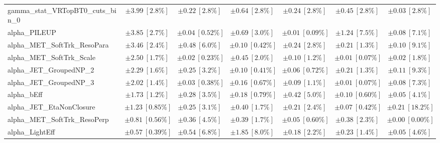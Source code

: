 \begin{sidewaystable}
\begin{center}
\begin{tabular*}{\textwidth}{@{\extracolsep{\fill}}lcccccc}
gamma\_stat\_VRTopBT0\_cuts\_bin\_0         & $\pm 3.99\ [2.8\%] $          & $\pm 0.22\ [2.8\%] $          & $\pm 0.64\ [2.8\%] $          & $\pm 0.24\ [2.8\%] $          & $\pm 0.45\ [2.8\%] $          & $\pm 0.03\ [2.8\%] $       \\
alpha\_PILEUP         & $\pm 3.85\ [2.7\%] $          & $\pm 0.04\ [0.52\%] $          & $\pm 0.69\ [3.0\%] $          & $\pm 0.01\ [0.09\%] $          & $\pm 1.24\ [7.5\%] $          & $\pm 0.08\ [7.1\%] $       \\
alpha\_MET\_SoftTrk\_ResoPara         & $\pm 3.46\ [2.4\%] $          & $\pm 0.48\ [6.0\%] $          & $\pm 0.10\ [0.42\%] $          & $\pm 0.24\ [2.8\%] $          & $\pm 0.21\ [1.3\%] $          & $\pm 0.10\ [9.1\%] $       \\
alpha\_MET\_SoftTrk\_Scale         & $\pm 2.50\ [1.7\%] $          & $\pm 0.02\ [0.23\%] $          & $\pm 0.45\ [2.0\%] $          & $\pm 0.10\ [1.2\%] $          & $\pm 0.01\ [0.07\%] $          & $\pm 0.02\ [1.8\%] $       \\
alpha\_JET\_GroupedNP\_2         & $\pm 2.29\ [1.6\%] $          & $\pm 0.25\ [3.2\%] $          & $\pm 0.10\ [0.41\%] $          & $\pm 0.06\ [0.72\%] $          & $\pm 0.21\ [1.3\%] $          & $\pm 0.11\ [9.3\%] $       \\
alpha\_JET\_GroupedNP\_3         & $\pm 2.02\ [1.4\%] $          & $\pm 0.03\ [0.38\%] $          & $\pm 0.16\ [0.67\%] $          & $\pm 0.09\ [1.1\%] $          & $\pm 0.01\ [0.07\%] $          & $\pm 0.08\ [7.3\%] $       \\
alpha\_bEff         & $\pm 1.73\ [1.2\%] $          & $\pm 0.28\ [3.5\%] $          & $\pm 0.18\ [0.79\%] $          & $\pm 0.42\ [5.0\%] $          & $\pm 0.10\ [0.60\%] $          & $\pm 0.05\ [4.1\%] $       \\
alpha\_JET\_EtaNonClosure         & $\pm 1.23\ [0.85\%] $          & $\pm 0.25\ [3.1\%] $          & $\pm 0.40\ [1.7\%] $          & $\pm 0.21\ [2.4\%] $          & $\pm 0.07\ [0.42\%] $          & $\pm 0.21\ [18.2\%] $       \\
alpha\_MET\_SoftTrk\_ResoPerp         & $\pm 0.81\ [0.56\%] $          & $\pm 0.36\ [4.5\%] $          & $\pm 0.39\ [1.7\%] $          & $\pm 0.05\ [0.60\%] $          & $\pm 0.38\ [2.3\%] $          & $\pm 0.00\ [0.00\%] $       \\
alpha\_LightEff         & $\pm 0.57\ [0.39\%] $          & $\pm 0.54\ [6.8\%] $          & $\pm 1.85\ [8.0\%] $          & $\pm 0.18\ [2.2\%] $          & $\pm 0.23\ [1.4\%] $          & $\pm 0.05\ [4.6\%] $       \\

\end{tabular*}
\end{center}
\end{sidewaystable}
